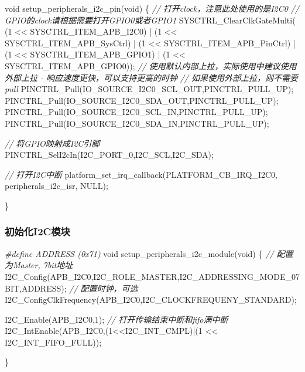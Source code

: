 \documentclass[
  12pt,
]{book}
\newenvironment{Shaded}{\begin{snugshade}}{\end{snugshade}}
\newcommand{\CommentTok}[1]{\textcolor[rgb]{0.56,0.35,0.01}{\textit{#1}}}
\newcommand{\DataTypeTok}[1]{\textcolor[rgb]{0.13,0.29,0.53}{#1}}
\newcommand{\DecValTok}[1]{\textcolor[rgb]{0.00,0.00,0.81}{#1}}
\newcommand{\NormalTok}[1]{#1}
\newcommand{\PreprocessorTok}[1]{\textcolor[rgb]{0.56,0.35,0.01}{\textit{#1}}}
\begin{document}
\begin{Shaded}
\begin{Highlighting}[]
\DataTypeTok{void}\NormalTok{ setup_peripherals_i2c_pin(}\DataTypeTok{void}\NormalTok{)}
\NormalTok{\{}
  \CommentTok{// 打开clock，注意此处使用的是I2C0}
  \CommentTok{// GPIO的clock请根据需要打开GPIO0或者GPIO1}
\NormalTok{  SYSCTRL_ClearClkGateMulti(    (}\DecValTok{1}\NormalTok{ << SYSCTRL_ITEM_APB_I2C0)}
\NormalTok{                                | (}\DecValTok{1}\NormalTok{ << SYSCTRL_ITEM_APB_SysCtrl)}
\NormalTok{                                | (}\DecValTok{1}\NormalTok{ << SYSCTRL_ITEM_APB_PinCtrl)}
\NormalTok{                                | (}\DecValTok{1}\NormalTok{ << SYSCTRL_ITEM_APB_GPIO1)}
\NormalTok{                                | (}\DecValTok{1}\NormalTok{ << SYSCTRL_ITEM_APB_GPIO0));}
  \CommentTok{// 使用默认内部上拉，实际使用中建议使用外部上拉 - 响应速度更快，可以支持更高的时钟}
  \CommentTok{// 如果使用外部上拉，则不需要pull}
\NormalTok{  PINCTRL_Pull(IO_SOURCE_I2C0_SCL_OUT,PINCTRL_PULL_UP);}
\NormalTok{  PINCTRL_Pull(IO_SOURCE_I2C0_SDA_OUT,PINCTRL_PULL_UP);}
\NormalTok{  PINCTRL_Pull(IO_SOURCE_I2C0_SCL_IN,PINCTRL_PULL_UP);}
\NormalTok{  PINCTRL_Pull(IO_SOURCE_I2C0_SDA_IN,PINCTRL_PULL_UP);}
  
  \CommentTok{// 将GPIO映射成I2C引脚}
\NormalTok{  PINCTRL_SelI2cIn(I2C_PORT_0,I2C_SCL,I2C_SDA);}
  
  \CommentTok{// 打开I2C中断}
\NormalTok{  platform_set_irq_callback(PLATFORM_CB_IRQ_I2C0, peripherals_i2c_isr, NULL);}
  
\NormalTok{\}}
\end{Highlighting}
\end{Shaded}

\hypertarget{ux521dux59cbux5316i2cux6a21ux5757}{%
\subsubsection{初始化I2C模块}\label{ux521dux59cbux5316i2cux6a21ux5757}}

\begin{Shaded}
\begin{Highlighting}[]
\PreprocessorTok{#define ADDRESS (0x71)}
\DataTypeTok{void}\NormalTok{ setup_peripherals_i2c_module(}\DataTypeTok{void}\NormalTok{)}
\NormalTok{\{}
  \CommentTok{// 配置为Master, 7bit地址}
\NormalTok{  I2C_Config(APB_I2C0,I2C_ROLE_MASTER,I2C_ADDRESSING_MODE_07BIT,ADDRESS);}
  \CommentTok{// 配置时钟，可选}
\NormalTok{  I2C_ConfigClkFrequency(APB_I2C0,I2C_CLOCKFREQUENY_STANDARD);}
  
\NormalTok{  I2C_Enable(APB_I2C0,}\DecValTok{1}\NormalTok{);}
  \CommentTok{// 打开传输结束中断和fifo满中断}
\NormalTok{  I2C_IntEnable(APB_I2C0,(}\DecValTok{1}\NormalTok{<<I2C_INT_CMPL)|(}\DecValTok{1}\NormalTok{ << I2C_INT_FIFO_FULL));}

\NormalTok{\}}
\end{Highlighting}
\end{Shaded}
\end{document}
